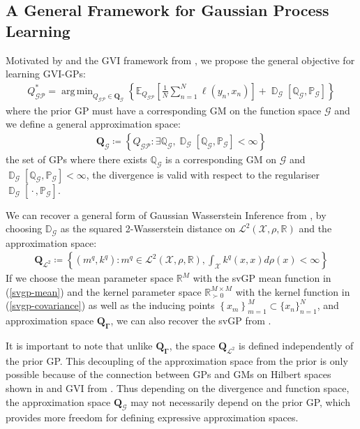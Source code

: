 \documentclass{article}
\newcommand{\D}{\operatorname{\mathbb{D}}}
\newcommand{\GP}{\operatorname{\mathcal{GP}}}
\newcommand{\wc}{\operatorname{{}\cdot{}}}
\DeclareMathOperator*{\argmin}{arg\,min}
\numberwithin{equation}{section}
\begin{document}
\subsection{A General Framework for Gaussian Process Learning}
Motivated by \cite{wild2022generalized} and the GVI framework from \cite{knoblauch2022optimization}, we propose the general objective for learning GVI-GPs:
\begin{align}
Q_{\GP}^* = \argmin_{Q_{\GP} \in \boldsymbol{Q}_{\mathcal{G}}} \left\{ \mathbb{E}_{Q_{\GP}}\left[\frac{1}{N}\sum_{n=1}^N \ell(y_n, x_n)\right] + \D_{\mathcal{G}}\left[\mathbb{Q}_{\mathcal{G}}, \mathbb{P}_{\mathcal{G}}\right]\right\}
\label{gvi-gp-objective}
\end{align}
where the prior GP must have a corresponding GM on the function space $\mathcal{G}$ and we define a general approximation space:
\begin{align}
    \boldsymbol{Q}_{\mathcal{G}} \coloneqq \left\{ 
    Q_{\GP} :  \exists \mathbb{Q}_{\mathcal{G}},  \D_{\mathcal{G}}\left[\mathbb{Q}_{\mathcal{G}}, \mathbb{P}_{\mathcal{G}}\right] < \infty
    \right\}
\end{align}
the set of GPs where there exists $\mathbb{Q}_{\mathcal{G}}$ is a corresponding GM on $\mathcal{G}$ and $\D_{\mathcal{G}}\left[\mathbb{Q}_{\mathcal{G}}, \mathbb{P}_{\mathcal{G}}\right] < \infty$, the divergence is valid with respect to the regulariser $\D_{\mathcal{G}}[\wc, \mathbb{P}_{\mathcal{G}}]$. 

We can recover a general form of Gaussian Wasserstein Inference from \cite{wild2022generalized}, by choosing $\mathbb{D}_{\mathcal{G}}$ as the squared 2-Wasserstein distance on $\mathcal{L}^2(\mathcal{X}, \rho, \mathbb{R})$ and the approximation space:
\begin{align}
    \boldsymbol{Q}_{\mathcal{L}^2} \coloneqq \left\{ 
    \left(m^q, k^q\right): m^q \in \mathcal{L}^2(\mathcal{X}, \rho, \mathbb{R}), \int_{\mathcal{X}} k^q(x, x)d\rho(x) < \infty
    \right\}
\end{align}
If we choose the mean parameter space $\mathbb{R}^M$ with the svGP mean function in (\ref{svgp-mean}) and the kernel parameter space $\mathbb{R}^{M\times M}_{\succ 0}$ with the kernel function in (\ref{svgp-covariance}) as well as the inducing points $\left\{x_m\right\}_{m=1}^{M} \subset \{x_n\}_{n=1}^{N}$, and approximation space $\boldsymbol{Q}_{\boldsymbol{\Gamma}}$, we can also recover the svGP from \cite{titsias2009variational}.

It is important to note that unlike $\boldsymbol{Q}_{\boldsymbol{\Gamma}}$, the space $\boldsymbol{Q}_{\mathcal{L}^2}$ is defined independently of the prior GP. This decoupling of the approximation space from the prior is only possible because of the connection between GPs and GMs on Hilbert spaces shown in \cite{wild2022generalized} and GVI from \cite{knoblauch2022optimization}. Thus depending on the divergence and function space, the approximation space $\boldsymbol{Q}_{\mathcal{G}}$ may not necessarily depend on the prior GP, which provides more freedom for defining expressive approximation spaces.
\end{document}
